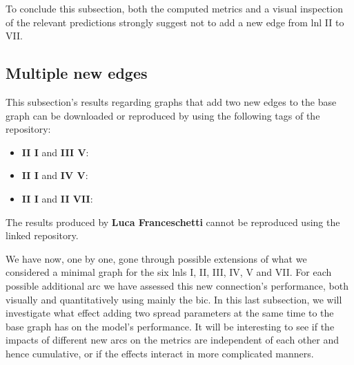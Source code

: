 \documentclass[\relativeRoot/main.tex]{subfiles}
\begin{document}
To conclude this subsection, both the computed metrics and a visual inspection of the relevant predictions strongly suggest not to add a new edge from \gls{lnl} II to VII.

\subsection{Multiple new edges}
\label{subsec:graph:extended:multiple}



\begin{tcolorbox}[title=\faIcon{recycle} Reproducibility, parbox=false]
    This subsection's results regarding graphs that add two new edges to the base graph can be downloaded or reproduced by using the following tags of the  repository:

    \begin{itemize}
        \item \textbf{II  I} and \textbf{III  V}: 
        \item \textbf{II  I} and \textbf{IV  V}: 
        \item \textbf{II  I} and \textbf{II  VII}: 
    \end{itemize}

    The results produced by  \textbf{Luca Franceschetti} \cite{franceschetti_comparison_2022} cannot be reproduced using the linked repository.
\end{tcolorbox}

We have now, one by one, gone through possible extensions of what we considered a minimal graph for the six \glspl{lnl} I, II, III, IV, V and VII. For each possible additional arc we have assessed this new connection's performance, both visually and quantitatively using mainly the \acrlong{bic}. In this last subsection, we will investigate what effect adding two spread parameters at the same time to the base graph has on the model's performance. It will be interesting to see if the impacts of different new arcs on the metrics are independent of each other and hence cumulative, or if the effects interact in more complicated manners.
\end{document}
